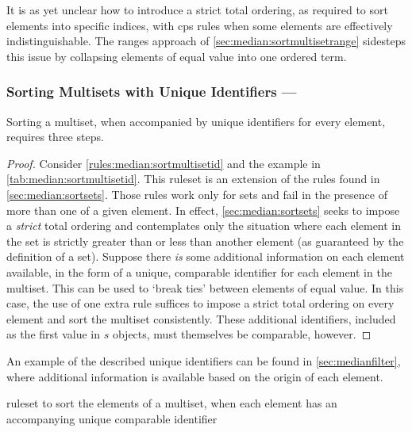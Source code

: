 It is as yet unclear how to introduce a strict total ordering, as required to sort elements into specific indices, with \gls{cps} rules when some elements are effectively indistinguishable.  The ranges approach of \cref{sec:median:sortmultisetrange} sidesteps this issue by collapsing elements of equal value into one ordered term.

\subsubsection{Sorting Multisets with Unique Identifiers --- }\label{sec:median:sortmultisetid}

\begin{proposition}\label{prop:median:sortmultisetid}
Sorting a multiset, when accompanied by unique identifiers for every element, requires three steps.
\end{proposition}

\begin{proof}
Consider \cref{rules:median:sortmultisetid} and the example in \cref{tab:median:sortmultisetid}.  This \gls{ruleset} is an extension of the rules found in \cref{sec:median:sortsets}.  Those rules work only for sets and fail in the presence of more than one of a given element.  In effect, \cref{sec:median:sortsets} seeks to impose a \emph{strict} total ordering and contemplates only the situation where each element in the set is strictly greater than or less than another element (as guaranteed by the definition of a set).  Suppose there \emph{is} some additional information on each element available, in the form of a unique, comparable identifier for each element in the multiset. This can be used to `break ties' between elements of equal value.  In this case, the use of one extra rule suffices to impose a strict total ordering on every element and sort the multiset consistently.  These additional identifiers, included as the first value in \(s\) objects, must themselves be comparable, however.
\end{proof}

An example of the described unique identifiers can be found in \vref{sec:medianfilter}, where additional information is available based on the origin of each element.

\begin{cprulesetfloat}
\begin{cpruleset}


\end{cpruleset}
\caption{\label{rules:median:sortmultisetid}\Gls{ruleset} to sort the elements of a multiset, when each element has an accompanying unique comparable identifier}
\end{cprulesetfloat}

